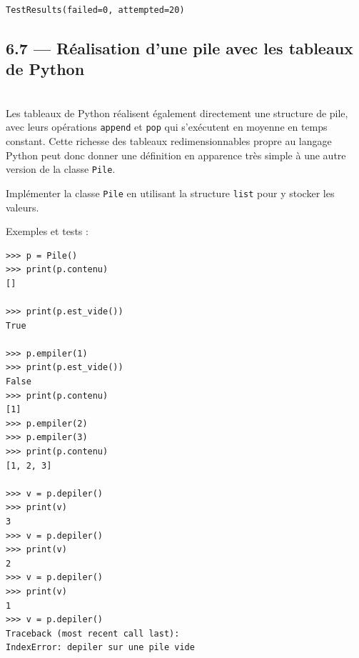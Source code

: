 \documentclass[a4paper,17pt]{extarticle}
\makeatletter
\newenvironment{eleve}%
{\begin{activite}\color{noiramu}\\[-0.5cm]}
{\end{activite}}
\newcommand{\boxspacing}{\kern\kvtcb@left@rule\kern\kvtcb@boxsep}
\newcommand{\prompt}[4]{
        \ttfamily\llap{{\color{#2}[#3]:\hspace{3pt}#4}}\vspace{-\baselineskip}
    }
\makeatother
\begin{document}
            \begin{tcolorbox}[breakable, size=fbox, boxrule=.5pt, pad at break*=1mm, opacityfill=0]
\prompt{Out}{outcolor}{9}{\boxspacing}
\begin{Verbatim}[commandchars=\\\{\}]
TestResults(failed=0, attempted=20)
\end{Verbatim}
\end{tcolorbox}
        
    \hypertarget{ruxe9alisation-dune-pile-avec-les-tableaux-de-python}{%
\subsection{6.7 --- Réalisation d'une pile avec les tableaux de
Python}\label{ruxe9alisation-dune-pile-avec-les-tableaux-de-python}}
\begin{eleve}
    Les tableaux de Python réalisent également directement une structure de
pile, avec leurs opérations \texttt{append} et \texttt{pop} qui
s'exécutent en moyenne en temps constant. Cette richesse des tableaux
redimensionnables propre au langage Python peut donc donner une
définition en apparence très simple à une autre version de la classe
\texttt{Pile}.

Implémenter la classe \texttt{Pile} en utilisant la structure
\texttt{list} pour y stocker les valeurs.

Exemples et tests :

\begin{verbatim}
>>> p = Pile()
>>> print(p.contenu)
[]

>>> print(p.est_vide())
True

>>> p.empiler(1)
>>> print(p.est_vide())
False
>>> print(p.contenu)
[1]
>>> p.empiler(2)
>>> p.empiler(3)
>>> print(p.contenu)
[1, 2, 3]

>>> v = p.depiler()
>>> print(v)
3
>>> v = p.depiler()
>>> print(v)
2
>>> v = p.depiler()
>>> print(v)
1
>>> v = p.depiler()
Traceback (most recent call last):
IndexError: depiler sur une pile vide
 
\end{verbatim}
        
        \end{eleve}
\end{document}
